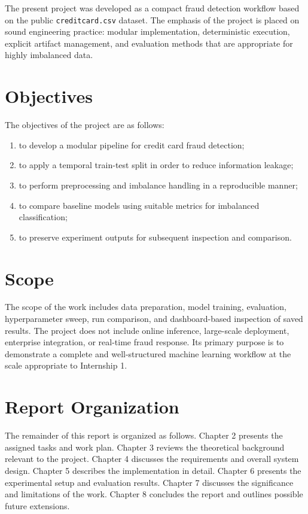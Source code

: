 \documentclass[12pt,a4paper]{report}
\begin{document}
The present project was developed as a compact fraud detection workflow based on the public \texttt{creditcard.csv} dataset. The emphasis of the project is placed on sound engineering practice: modular implementation, deterministic execution, explicit artifact management, and evaluation methods that are appropriate for highly imbalanced data.

\section{Objectives}
The objectives of the project are as follows:
\begin{enumerate}
    \item to develop a modular pipeline for credit card fraud detection;
    \item to apply a temporal train-test split in order to reduce information leakage;
    \item to perform preprocessing and imbalance handling in a reproducible manner;
    \item to compare baseline models using suitable metrics for imbalanced classification;
    \item to preserve experiment outputs for subsequent inspection and comparison.
\end{enumerate}

\section{Scope}
The scope of the work includes data preparation, model training, evaluation, hyperparameter sweep, run comparison, and dashboard-based inspection of saved results. The project does not include online inference, large-scale deployment, enterprise integration, or real-time fraud response. Its primary purpose is to demonstrate a complete and well-structured machine learning workflow at the scale appropriate to Internship 1.

\section{Report Organization}
The remainder of this report is organized as follows. Chapter 2 presents the assigned tasks and work plan. Chapter 3 reviews the theoretical background relevant to the project. Chapter 4 discusses the requirements and overall system design. Chapter 5 describes the implementation in detail. Chapter 6 presents the experimental setup and evaluation results. Chapter 7 discusses the significance and limitations of the work. Chapter 8 concludes the report and outlines possible future extensions.
\end{document}
